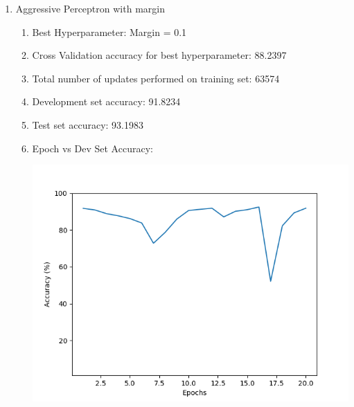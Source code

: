 \begin{enumerate}
\begin{enumerate}
		\item Aggressive Perceptron with margin
			\begin{enumerate}
				\item Best Hyperparameter: Margin = 0.1
				\item Cross Validation accuracy for best hyperparameter: 88.2397
				\item Total number of updates performed on training set: 63574
				\item Development set accuracy: 91.8234
				\item Test set accuracy: 93.1983
				\item Epoch vs Dev Set Accuracy:
					\begin{center}
						\includegraphics[scale=0.7]{aggressive}
					\end{center}
			\end{enumerate}	
	
	\end{enumerate}

\end{enumerate}